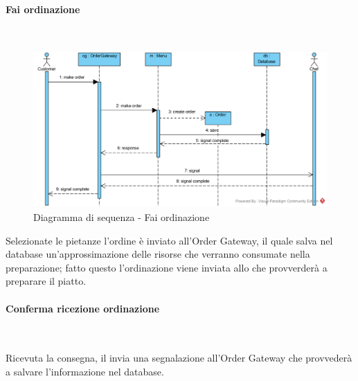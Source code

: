 \begin{samepage}
\paragraph{Fai ordinazione}\mbox{}\\
\end{samepage}
\begin{figure}[H]
	\centering
	\includegraphics[width=15cm]{../../documenti/SpecificaTecnica/diagrammi/sequenza/cliente_fai_ordinazione.png}
	\caption{Diagramma di sequenza - Fai ordinazione}
\end{figure}
Selezionate le pietanze l'ordine è inviato all'Order Gateway, il quale salva nel database un'approssimazione delle risorse che verranno consumate nella preparazione; fatto questo l'ordinazione viene inviata allo \Chef{} che provverderà a preparare il piatto.

\begin{samepage}
\paragraph{Conferma ricezione ordinazione}\mbox{}\\
\end{samepage}
Ricevuta la consegna, il \Customer{} invia una segnalazione all'Order Gateway che provvederà a salvare l'informazione nel database.

